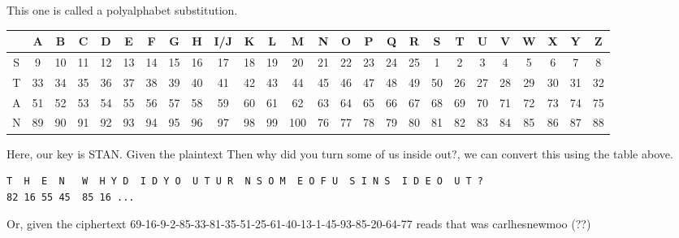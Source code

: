 \documentclass[11pt]{article}
\theoremstyle{definition}\newtheorem{definition}{Definition}
\theoremstyle{definition}\newtheorem{example}{Example}
\theoremstyle{definition}\newtheorem{samplecode}{Sample Code}
\begin{document}
This one is called a polyalphabet substitution.
\begin{center}\tiny
    \begin{tabular}{c|ccccccccccccccccccccccccc}
        & A & B & C & D & E & F & G & H & I/J & K & L & M & N & O & P & Q & R & S & T & U & V & W & X & Y & Z \\ \hline
        S & 9 & 10 & 11 & 12 & 13 & 14 & 15 & 16 & 17 & 18 & 19 & 20 & 21 & 22 & 23 & 24 & 25 & 1 & 2 & 3 & 4 & 5 & 6 & 7 & 8 \\
        T & 33 & 34 & 35 & 36 & 37 & 38 & 39 & 40 & 41 & 42 & 43 & 44 & 45 & 46 & 47 & 48 & 49 & 50 & 26 & 27 & 28 & 29 & 30 & 31 & 32 \\
        A & 51 & 52 & 53 & 54 & 55 & 56 & 57 & 58 & 59 & 60 & 61 & 62 & 63 & 64 & 65 & 66 & 67 & 68 & 69 & 70 & 71 & 72 & 73 & 74 & 75 \\
        N & 89 & 90 & 91 & 92 & 93 & 94 & 95 & 96 & 97 & 98 & 99 & 100 & 76 & 77 & 78 & 79 & 80 & 81 & 82 & 83 & 84 & 85 & 86 & 87 & 88 \\
    \end{tabular}
\end{center}
Here, our key is \textsf{STAN}. Given the plaintext \textsf{Then why did you turn some of us inside out?}, we can convert this using the table above.
\begin{verbatim}
T  H  E  N   W  H Y D  I D Y O  U T U R  N S O M  E O F U  S I N S  I D E O  U T ?
82 16 55 45  85 16 ...
\end{verbatim}
Or, given the ciphertext \textsf{69-16-9-2-85-33-81-35-51-25-61-40-13-1-45-93-85-20-64-77} reads that was carlhesnewmoo (??)
\end{document}
